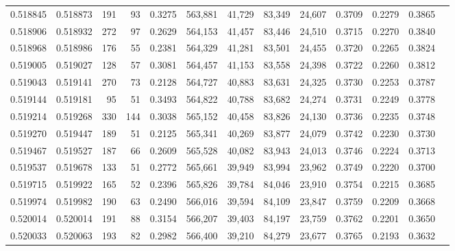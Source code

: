 \begin{tabular}{rrrrrrrrrrrrr}
0.518845 & 0.518873 &   191 &    93 &                                     0.3275 & 563,881 &  41,729 &  83,349 &  24,607 & 0.3709 & 0.2279 & 0.3865 \\
0.518906 & 0.518932 &   272 &    97 &                                     0.2629 & 564,153 &  41,457 &  83,446 &  24,510 & 0.3715 & 0.2270 & 0.3840 \\
0.518968 & 0.518986 &   176 &    55 &                                     0.2381 & 564,329 &  41,281 &  83,501 &  24,455 & 0.3720 & 0.2265 & 0.3824 \\
0.519005 & 0.519027 &   128 &    57 &                                     0.3081 & 564,457 &  41,153 &  83,558 &  24,398 & 0.3722 & 0.2260 & 0.3812 \\
0.519043 & 0.519141 &   270 &    73 &                                     0.2128 & 564,727 &  40,883 &  83,631 &  24,325 & 0.3730 & 0.2253 & 0.3787 \\
0.519144 & 0.519181 &    95 &    51 &                                     0.3493 & 564,822 &  40,788 &  83,682 &  24,274 & 0.3731 & 0.2249 & 0.3778 \\
0.519214 & 0.519268 &   330 &   144 &                                     0.3038 & 565,152 &  40,458 &  83,826 &  24,130 & 0.3736 & 0.2235 & 0.3748 \\
0.519270 & 0.519447 &   189 &    51 &                                     0.2125 & 565,341 &  40,269 &  83,877 &  24,079 & 0.3742 & 0.2230 & 0.3730 \\
0.519467 & 0.519527 &   187 &    66 &                                     0.2609 & 565,528 &  40,082 &  83,943 &  24,013 & 0.3746 & 0.2224 & 0.3713 \\
0.519537 & 0.519678 &   133 &    51 &                                     0.2772 & 565,661 &  39,949 &  83,994 &  23,962 & 0.3749 & 0.2220 & 0.3700 \\
0.519715 & 0.519922 &   165 &    52 &                                     0.2396 & 565,826 &  39,784 &  84,046 &  23,910 & 0.3754 & 0.2215 & 0.3685 \\
0.519974 & 0.519982 &   190 &    63 &                                     0.2490 & 566,016 &  39,594 &  84,109 &  23,847 & 0.3759 & 0.2209 & 0.3668 \\
0.520014 & 0.520014 &   191 &    88 &                                     0.3154 & 566,207 &  39,403 &  84,197 &  23,759 & 0.3762 & 0.2201 & 0.3650 \\
0.520033 & 0.520063 &   193 &    82 &                                     0.2982 & 566,400 &  39,210 &  84,279 &  23,677 & 0.3765 & 0.2193 & 0.3632 \\

\end{tabular}
